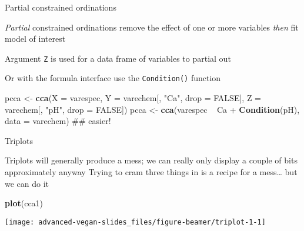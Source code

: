 \documentclass[10pt,ignorenonframetext,compress, aspectratio=169]{beamer}
\newenvironment{Shaded}{\begin{snugshade}}{\end{snugshade}}
\newcommand{\KeywordTok}[1]{\textcolor[rgb]{0.13,0.29,0.53}{\textbf{{#1}}}}
\newcommand{\DataTypeTok}[1]{\textcolor[rgb]{0.13,0.29,0.53}{{#1}}}
\newcommand{\StringTok}[1]{\textcolor[rgb]{0.31,0.60,0.02}{{#1}}}
\newcommand{\OtherTok}[1]{\textcolor[rgb]{0.56,0.35,0.01}{{#1}}}
\newcommand{\NormalTok}[1]{{#1}}
\begin{document}
\begin{frame}[fragile]{Partial constrained ordinations}

\emph{Partial} constrained ordinations remove the effect of one or more
variables \emph{then} fit model of interest

Argument \texttt{Z} is used for a data frame of variables to partial out

Or with the formula interface use the \texttt{Condition()} function

\scriptsize

\begin{Shaded}
\begin{Highlighting}[]
\NormalTok{pcca <-}\StringTok{ }\KeywordTok{cca}\NormalTok{(}\DataTypeTok{X =} \NormalTok{varespec,}
            \DataTypeTok{Y =} \NormalTok{varechem[, }\StringTok{"Ca"}\NormalTok{, }\DataTypeTok{drop =} \OtherTok{FALSE}\NormalTok{],}
            \DataTypeTok{Z =} \NormalTok{varechem[, }\StringTok{"pH"}\NormalTok{, }\DataTypeTok{drop =} \OtherTok{FALSE}\NormalTok{])}
\NormalTok{pcca <-}\StringTok{ }\KeywordTok{cca}\NormalTok{(varespec ~}\StringTok{ }\NormalTok{Ca +}\StringTok{ }\KeywordTok{Condition}\NormalTok{(pH), }\DataTypeTok{data =} \NormalTok{varechem) ## easier!}
\end{Highlighting}
\end{Shaded}

\normalsize

\end{frame}

\begin{frame}[fragile]{Triplots}

Triplots will generally produce a mess; we can really only display a
couple of bits approximately anyway Trying to cram three things in is a
recipe for a mess\ldots{} but we can do it

\scriptsize

\begin{Shaded}
\begin{Highlighting}[]
\KeywordTok{plot}\NormalTok{(cca1)}
\end{Highlighting}
\end{Shaded}

\begin{center}\texttt{[image: advanced-vegan-slides\_files/figure-beamer/triplot-1-1]} \end{center}

\normalsize

\end{frame}
\end{document}
